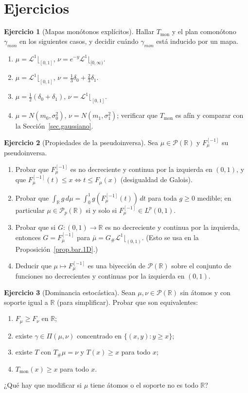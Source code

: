 \documentclass[12pt, a4paper]{amsbook}
\newcommand{\R}{{\mathbb R}}
\newcommand{\LL}{{\mathcal L}}
\theoremstyle{remark}
\theoremstyle{definition}
\newtheorem{ejercicio}{Ejercicio}[chapter]
\numberwithin{section}{chapter}
\numberwithin{subsection}{section}
\numberwithin{equation}{section}
\numberwithin{figure}{chapter}
\begin{document}
\section*{Ejercicios}

\begin{ejercicio}[Mapas monótonos explícitos]\label{ejer.1D.explicitos}
Hallar $T_\text{mon}$ y el plan comonótono $\gamma_{mon}$ en los siguientes
casos, y decidir cuándo $\gamma_{mon}$ está inducido por un mapa.
\begin{enumerate}[label=(\alph*)]
\item $\mu=\LL^1\lfloor_{[0,1]}$, $\nu=e^{-y}\LL^1\lfloor_{[0,\infty)}$.
\item $\mu=\LL^1\lfloor_{[0,1]}$, $\nu=\frac13\delta_0+\frac23\delta_1$.
\item $\mu=\frac12(\delta_0+\delta_1)$, $\nu=\LL^1\lfloor_{[0,1]}$.
\item $\mu=N(m_0,\sigma_0^2)$, $\nu=N(m_1,\sigma_1^2)$; verificar que
$T_\text{mon}$ es afín y comparar con la Sección~\ref{sec.gaussiano}.
\end{enumerate}
\end{ejercicio}

\begin{ejercicio}[Propiedades de la pseudoinversa]\label{ejer.pseudoinversa}
Sea $\mu\in\mathcal P(\R)$ y $F^{[-1]}_\mu$ su pseudoinversa.
\begin{enumerate}[label=(\alph*)]
\item Probar que $F_\mu^{[-1]}$ es no decreciente y continua por la
izquierda en $(0,1)$, y que $F_\mu^{[-1]}(t)\le x\iff t\le F_\mu(x)$
(desigualdad de Galois).
\item Probar que $\int_\R g\,d\mu=\int_0^1g(F_\mu^{[-1]}(t))\,dt$ para toda
$g\ge0$ medible; en particular $\mu\in\mathcal P_p(\R)$ si y solo si
$F_\mu^{[-1]}\in L^p(0,1)$.
\item Probar que si $G\colon(0,1)\to\R$ es no decreciente y continua por la
izquierda, entonces $G=F_{\bar\mu}^{[-1]}$ para $\bar\mu=G_\#\LL^1\lfloor_{(0,1)}$.
(Esto se usa en la Proposición~\ref{prop.bar.1D}.)
\item Deducir que $\mu\mapsto F_\mu^{[-1]}$ es una biyección de
$\mathcal P(\R)$ sobre el conjunto de funciones no decrecientes y continuas
por la izquierda en $(0,1)$.
\end{enumerate}
\end{ejercicio}

\begin{ejercicio}[Dominancia estocástica]\label{ejer.1D.dominancia}
Sean $\mu,\nu\in\mathcal P(\R)$ sin átomos y con soporte igual a $\R$
(para simplificar). Probar que son equivalentes:
\begin{enumerate}[label=(\alph*)]
\item $F_\mu\ge F_\nu$ en $\R$;
\item existe $\gamma\in\Pi(\mu,\nu)$ concentrado en $\{(x,y):y\ge x\}$;
\item existe $T$ con $T_\#\mu=\nu$ y $T(x)\ge x$ para todo $x$;
\item $T_\text{mon}(x)\ge x$ para todo $x$.
\end{enumerate}
¿Qué hay que modificar si $\mu$ tiene átomos o el soporte no es todo $\R$?
\end{ejercicio}
\end{document}
